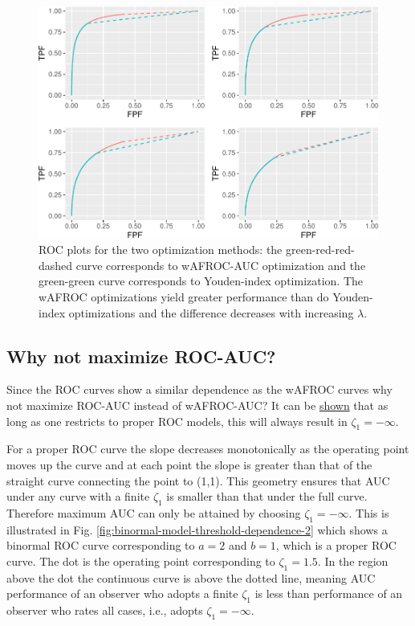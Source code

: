 \documentclass[
]{book}
\begin{document}
\begin{figure}
\centering
\includegraphics{21-optim-op-point_files/figure-latex/optim-op-point-vary-lambda-roc-1.pdf}
\caption{\label{fig:optim-op-point-vary-lambda-roc}ROC plots for the two optimization methods: the green-red-red-dashed curve corresponds to wAFROC-AUC optimization and the green-green curve corresponds to Youden-index optimization. The wAFROC optimizations yield greater performance than do Youden-index optimizations and the difference decreases with increasing \(\lambda\).}
\end{figure}

\hypertarget{why-not-maximize-roc-auc}{%
\subsection{Why not maximize ROC-AUC?}\label{why-not-maximize-roc-auc}}

Since the ROC curves show a similar dependence as the wAFROC curves why not maximize ROC-AUC instead of wAFROC-AUC? It can be \href{https://dpc10ster.github.io/RJafrocRocBook/binormal-model.html\#binormal-model-partial-true}{shown} that as long as one restricts to proper ROC models, this will always result in \(\zeta_1 = -\infty\).

For a proper ROC curve the slope decreases monotonically as the operating point moves up the curve and at each point the slope is greater than that of the straight curve connecting the point to (1,1). This geometry ensures that AUC under any curve with a finite \(\zeta_1\) is smaller than that under the full curve. Therefore maximum AUC can only be attained by choosing \(\zeta_1 = -\infty\). This is illustrated in Fig. \ref{fig:binormal-model-threshold-dependence-2} which shows a binormal ROC curve corresponding to \(a = 2\) and \(b = 1\), which is a proper ROC curve. The dot is the operating point corresponding to \(\zeta_1 = 1.5\). In the region above the dot the continuous curve is above the dotted line, meaning AUC performance of an observer who adopts a finite \(\zeta_1\) is less than performance of an observer who rates all cases, i.e., adopts \(\zeta_1 = -\infty\).
\end{document}
